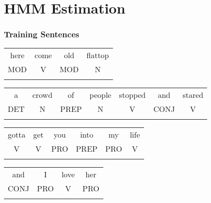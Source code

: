 \documentclass{beamer}
\begin{document}
\section{HMM Estimation}

\begin{frame}
\frametitle{Training Sentences} 
\begin{center}

\begin{tabular}{cccc}
here & come & old & flattop \\
MOD  & V    & MOD & N \\
& & & \\
\end{tabular}

\begin{tabular}{ccccccc}
a & crowd & of & people & stopped & and & stared \\
DET & N & PREP & N & V & CONJ & V \\
& & & & &  \\
\end{tabular}

\begin{tabular}{cccccc}
gotta & get & you & into & my & life \\
V & V & PRO& PREP & PRO & V\\
 & & & & &  \\
\end{tabular}

\begin{tabular}{cccc}
and & I & love & her \\
CONJ & PRO & V & PRO \\
& & & \\
\end{tabular}

\end{center}

\end{frame}
\end{document}
